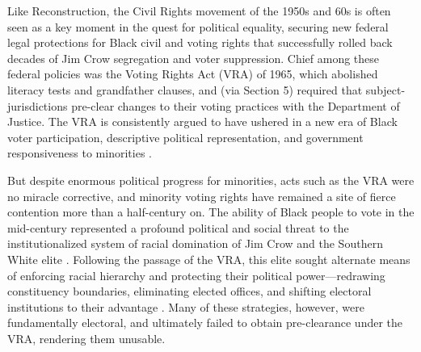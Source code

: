 \documentclass[12pt]{article}
\begin{document}

Like Reconstruction, the Civil Rights movement of the 1950s and 60s is often seen as a key moment in the quest for political equality, securing new federal legal protections for Black civil and voting rights that successfully rolled back decades of Jim Crow segregation and voter suppression.  Chief among these federal policies was the Voting Rights Act (VRA) of 1965, which abolished literacy tests and grandfather clauses, and (via Section 5) required that subject-jurisdictions pre-clear changes to their voting practices with the Department of Justice.  The VRA is consistently argued to have ushered in a new era of Black voter participation, descriptive political representation, and government responsiveness to minorities \citep{Davidson:1994ue,BullockIII:2009uu,Washington:2014tk,Fresh:2018td,Bernini:2017tv,Aneja:2019uz}.

But despite enormous political progress for minorities, acts such as the VRA were no miracle corrective, and minority voting rights have remained a site of fierce contention more than a half-century on. The ability of Black people to vote in the mid-century represented a profound political and social threat to the institutionalized system of racial domination of Jim Crow and the Southern White elite \citep{KeyJr:1950ta,Valelly:2004uh,Mickey:2015vh}.  Following the passage of the VRA, this elite sought alternate means of enforcing racial hierarchy and protecting their political power---redrawing constituency boundaries, eliminating elected offices, and shifting electoral institutions to their advantage \citep{McDonald:2003tz,Rosenberg:2008wz,Keyssar:2009tl,Komisarchik:2018wu}.   Many of these strategies, however, were fundamentally electoral, and ultimately failed to obtain pre-clearance under the VRA, rendering them unusable.
\end{document}
